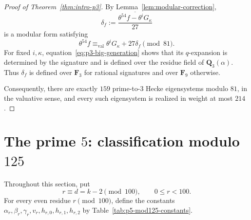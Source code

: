 \documentclass[11pt]{article}
\theoremstyle{plain}
\theoremstyle{definition}
\theoremstyle{remark}
\numberwithin{equation}{section}
\begin{document}
\begin{proof}[Proof of Theorem~\ref{thm:intro-p3}]
By Lemma~\ref{lem:modular-correction}, \[ \delta_f:= \overline{\frac{\theta^{54}f-\theta^iG_\kappa}{27}} \] is a modular form satisfying \[ \theta^{54}f\equiv_{\mathrm{val}} \theta^iG_\kappa+27\delta_f\pmod{81}. \] For fixed \(i,\kappa\), equation~\eqref{eq:p3-big-generation} shows that its \(q\)-expansion is determined by the signature and is defined over the residue field of \(\mathbf Q_3(\alpha)\). Thus \(\delta_f\) is defined over \(\mathbf F_3\) for rational signatures and over \(\mathbf F_9\) otherwise.

Consequently, there are exactly \(159\) prime-to-\(3\) Hecke eigensystems modulo \(81\), in the valuative sense, and every such eigensystem is realized in weight at most \(214\). 
\end{proof}

\section{The prime \texorpdfstring{\(5\)}{5}: classification modulo
\texorpdfstring{\(125\)}{125}}
\label{sec:p5-mod125}

Throughout this section, put \[ r\equiv d=k-2\pmod{100},\qquad 0\leq r<100. \]
For every even residue \(r\pmod{100}\), define the constants
\(\alpha_r,\beta_r,\gamma_r,v_r,h_{r,0},h_{r,1},h_{r,2}\)
by Table~\ref{tab:p5-mod125-constants}.
\end{document}
